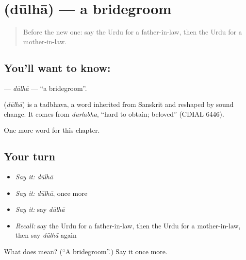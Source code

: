 \section[\texorpdfstring{\ur{دولہا} (dūlhā)}{دولہا (dūlhā)}]{ (dūlhā) — a bridegroom}

\label{lesson:UR-C230-dulha}



\begin{quote}
Before the new one: say the Urdu for a father-in-law, then the Urdu for a mother-in-law.
\end{quote}

\subsection*{You'll want to know: }
\textbf{} — \emph{dūlhā} — \textquotedblleft{}a bridegroom\textquotedblright{}.

\begin{cousinweb}
\textbf{} (\emph{dūlhā}) is a tadbhava, a word inherited from Sanskrit and reshaped by sound change. It comes from \emph{durlabha}, \textquotedblleft{}hard to obtain; beloved\textquotedblright{} (CDIAL 6446).
\end{cousinweb}

\begin{grammarlens}[title={What you've built}]
One more word for this chapter.
\end{grammarlens}

\subsection*{Your turn}
\begin{itemize}
\raggedright
  \item \emph{Say it:} \emph{dūlhā}
  \item \emph{Say it:} \emph{dūlhā}, once more
  \item \emph{Say it:} say \emph{dūlhā}
  \item \emph{Recall:} say the Urdu for a father-in-law, then the Urdu for a mother-in-law, then say \emph{dūlhā} again
\end{itemize}

\begin{tcolorbox}[breakable,colback=teal!4,colframe=teal!35!black,title={Before you move on}]
What does  mean? (\textquotedblleft{}A bridegroom\textquotedblright{}.) Say it once more.
\end{tcolorbox}
